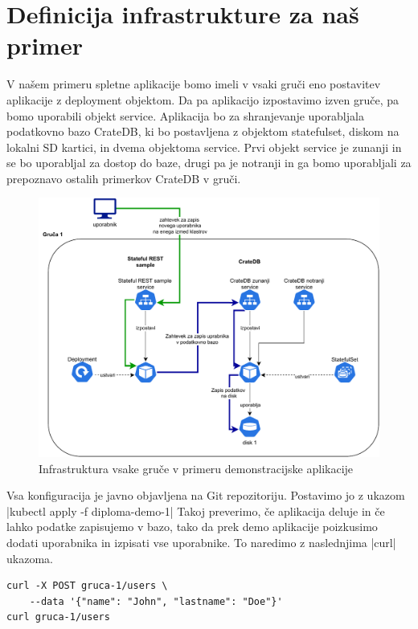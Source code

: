 \documentclass[a4paper, 12pt]{book}
\begin{document}
\section{Definicija infrastrukture za naš primer}
V našem primeru spletne aplikacije bomo imeli v vsaki gruči eno postavitev aplikacije  z deployment objektom. 
Da pa aplikacijo izpostavimo izven gruče, pa bomo uporabili objekt service.
Aplikacija bo za shranjevanje uporabljala podatkovno bazo CrateDB, ki bo postavljena z objektom statefulset, diskom na lokalni SD kartici, in dvema objektoma service.
Prvi objekt service je zunanji in se bo uporabljal za dostop do baze, drugi pa je notranji in ga bomo uporabljali za prepoznavo ostalih primerkov CrateDB v gruči.
\begin{figure}[h]
\begin{center}
\includegraphics[width=1.0\textwidth]{images/infrastructure-example.pdf}
\end{center}
\caption{Infrastruktura vsake gruče v primeru demonstracijske aplikacije}
\label{primer-uporabe-helm-predloge-argo-cd}
\end{figure}
Vsa konfiguracija je javno objavljena na Git repozitoriju\cite{git-diploma}. Postavimo jo z ukazom \spverb|kubectl apply -f diploma-demo-1|
Takoj preverimo, če aplikacija deluje in če lahko podatke zapisujemo v bazo, tako da prek demo aplikacije poizkusimo dodati uporabnika in izpisati vse uporabnike.
To naredimo z naslednjima \spverb|curl| ukazoma.
\begin{verbatim}
curl -X POST gruca-1/users \
    --data '{"name": "John", "lastname": "Doe"}'
curl gruca-1/users
\end{verbatim}
\end{document}
